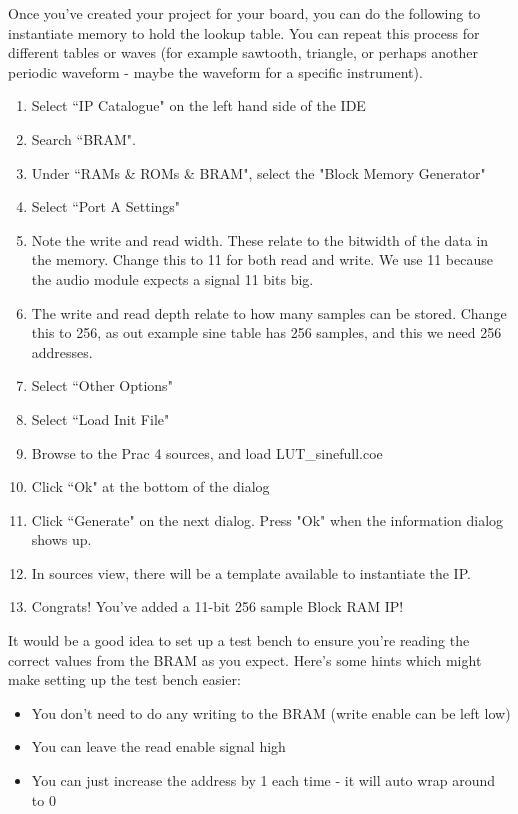 Once you've created your project for your board, you can do the following to instantiate memory to hold the lookup table. You can repeat this process for different tables or waves (for example sawtooth, triangle, or perhaps another periodic waveform - maybe the waveform for a specific instrument).
\begin{enumerate}
    \item Select ``IP Catalogue" on the left hand side of the IDE
    \item Search ``BRAM".
    \item Under ``RAMs \& ROMs \& BRAM", select the "Block Memory Generator"
    \item Select ``Port A Settings"
    \item Note the write and read width. These relate to the bitwidth of the data in the memory. Change this to 11 for both read and write. We use 11 because the audio module expects a signal 11 bits big.
    \item The write and read depth relate to how many samples can be stored. Change this to 256, as out example sine table has 256 samples, and this we need 256 addresses.
    \item Select ``Other Options"
    \item Select ``Load Init File"
    \item Browse to the Prac 4 sources, and load LUT\_sinefull.coe
    \item Click ``Ok" at the bottom of the dialog
    \item Click ``Generate" on the next dialog. Press "Ok" when the information dialog shows up.
    \item In sources view, there will be a template available to instantiate the IP.
    \item Congrats! You've added a 11-bit 256 sample Block RAM IP!
\end{enumerate}

It would be a good idea to set up a test bench to ensure you're reading the correct values from the BRAM as you expect. Here's some hints which might make setting up the test bench easier:
\begin{itemize}
    \item You don't need to do any writing to the BRAM (write enable can be left low)
    \item You can leave the read enable signal high
    \item You can just increase the address by 1 each time - it will auto wrap around to 0
\end{itemize}

